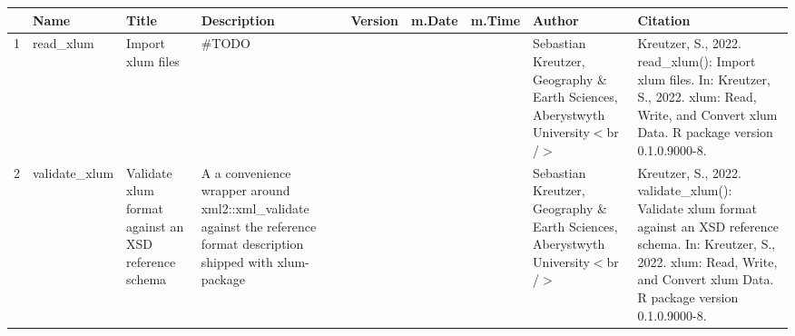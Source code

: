 \begin{table}[ht]
\centering
\begin{tabular}{rllllllll}
  \hline
 & Name & Title & Description & Version & m.Date & m.Time & Author & Citation \\ 
  \hline
1 & read\_xlum & Import xlum files & \#TODO &  &  &  & Sebastian Kreutzer, Geography \& Earth Sciences, Aberystwyth University$<$br /$>$ & Kreutzer, S., 2022. read\_xlum(): Import xlum files. In: Kreutzer, S., 2022. xlum: Read, Write, and Convert xlum Data. R package version 0.1.0.9000-8. 
 \\ 
  2 & validate\_xlum & Validate xlum format against an XSD reference schema & A a convenience wrapper around  xml2::xml\_validate  against the reference format description shipped with  xlum-package &  &  &  & Sebastian Kreutzer, Geography \& Earth Sciences, Aberystwyth University$<$br /$>$ & Kreutzer, S., 2022. validate\_xlum(): Validate xlum format against an XSD reference schema. In: Kreutzer, S., 2022. xlum: Read, Write, and Convert xlum Data. R package version 0.1.0.9000-8. 
 \\ 
   \hline
\end{tabular}
\end{table}

